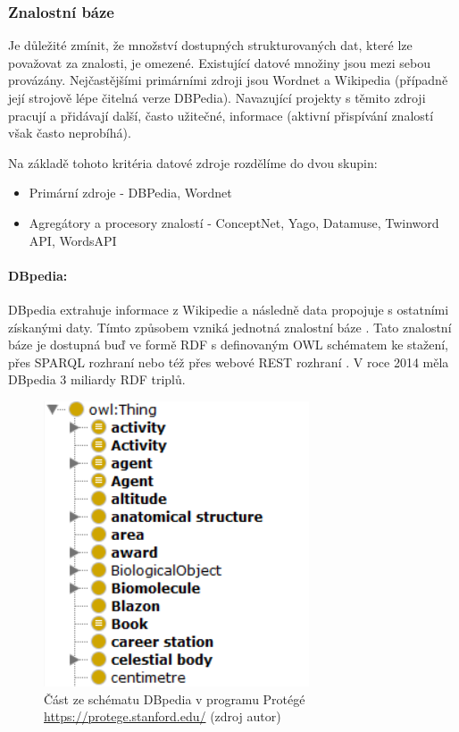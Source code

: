 \subsubsection{Znalostní báze}
Je důležité zmínit, že množství dostupných strukturovaných dat, které lze považovat za znalosti, je omezené. Existující datové množiny jsou mezi sebou provázány. Nejčastějšími primárními zdroji jsou Wordnet a Wikipedia (případně její strojově lépe čitelná verze DBPedia). Navazující projekty s těmito zdroji pracují a přidávají další, často užitečné, informace (aktivní přispívání znalostí však často neprobíhá).\par
\noindent Na základě tohoto kritéria datové zdroje rozdělíme do dvou skupin:
\begin{itemize}
    \item Primární zdroje - DBPedia, Wordnet
    \item Agregátory a procesory znalostí - ConceptNet, Yago, Datamuse, Twinword API, WordsAPI
\end{itemize}

\paragraph{DBpedia:}
DBpedia extrahuje informace z Wikipedie a následně data propojuje s ostatními získanými daty. Tímto způsobem vzniká jednotná znalostní báze \cite{db-pedia-article}. Tato znalostní báze je dostupná buď ve formě RDF s definovaným OWL schématem ke stažení, přes SPARQL rozhraní nebo též přes webové REST rozhraní \cite{db-pedia-web}. V roce 2014 měla DBpedia 3 miliardy RDF triplů. \cite{db-pedia-web}
\begin{figure}[htbp!]
	\includegraphics[width=0.45\linewidth]{img/db-pedia.png}
	\caption{Část ze schématu DBpedia v programu Protégé \url{https://protege.stanford.edu/} (zdroj autor)}
	\label{fig:dbpedia}
\end{figure}
